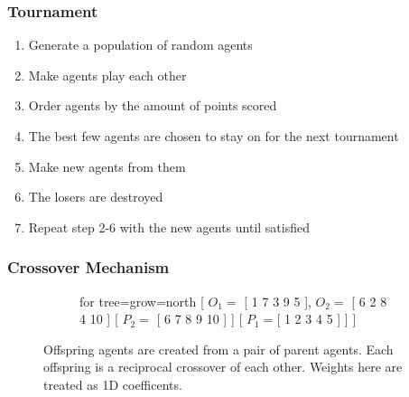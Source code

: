 \documentclass[aspectratio=169]{beamer}
\begin{document}
	\begin{frame}
		\frametitle{Tournament}
		\begin{enumerate}
			\item Generate a population of random agents
			\item Make agents play each other
			\item Order agents by the amount of points scored
			\item The best few agents are chosen to stay on for the next tournament
			\item Make new agents from them
			\item The losers are destroyed
			\item Repeat step 2-6 with the new agents until satisfied
		\end{enumerate}
	\end{frame}


	\begin{frame}
		\frametitle{Crossover Mechanism}

		\begin{figure}
			\begin{figure}
				\LARGE
			\begin{forest}
				for tree={grow=north}
				[	{
					$O_{1} =$ [ 
							{\color{red}1}
							{\color{blue}7}
							{\color{red}3}
							{\color{blue}9}
							{\color{red}5} 
						], 
						$O_{2} =$	[ 
							{\color{blue}6}
							{\color{red}2}
							{\color{blue}8}
							{\color{red}4}
							{\color{blue}10} 
						]
					}
					[
						{
							$P_{2} =$ [
								{\color{blue}6}
								{\color{blue}7}
								{\color{blue}8}
								{\color{blue}9}
								{\color{blue}10}
							]
						}
					]
					[
						{
							$P_{1} =$[
								{\color{red}1}
								{\color{red}2}
								{\color{red}3}
								{\color{red}4}
								{\color{red}5}
							]
						}
					] 
				]
			\end{forest}
			\vspace{10mm}
		\end{figure}
			Offspring agents are created from a pair of parent agents.
			Each offspring is a reciprocal crossover of each other.
			Weights here are treated as 1D coefficents.
		\end{figure}
				
	\end{frame}
\end{document}
